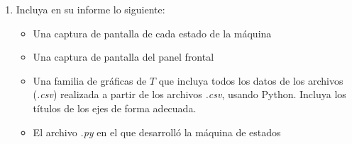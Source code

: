 \begin{enumerate}
\begin{itemize}
\begin{itemize}
            \item \emph{world}: estado que concatena letra por letra la palabra "world" en el string, al finalizar la palabra pasa a estado \emph{end}
            \item \emph{end}: estado que termina la ejecución del programa.
        \end{itemize}
    \item Mostrar como avanza la concatenación del string
    \item Mostrar como avanza el tiempo en segundos en cada estado
\end{itemize}
\item Incluya en su informe lo siguiente:
    \begin{itemize}
        \item Una captura de pantalla de cada estado de la máquina 
        \item Una captura de pantalla del panel frontal
        \item Una familia de gráficas de $T$ que incluya todos los datos de los archivos (\emph{.csv}) realizada a partir de los archivos \emph{.csv}, usando Python. Incluya los títulos de los ejes de forma adecuada. 
        \item El archivo \emph{.py} en el que desarrolló la máquina de estados
    \end{itemize}

\end{enumerate}
